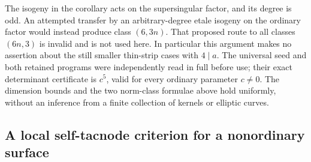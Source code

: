 \begin{remark}
\label{rem:DE-A3-mixed-axis-scope}
The isogeny in the corollary acts on the supersingular factor,
and its degree is odd.
An attempted transfer by an arbitrary-degree etale isogeny on
the ordinary factor would instead produce class $(6,3n)$.
That proposed route to all classes $(6n,3)$ is invalid and is
not used here.  In particular this argument makes no assertion
about the still smaller thin-strip cases with $4\mid a$.
The universal seed and both retained programs were independently
read in full before use; their exact determinant certificate is
$c^5$, valid for every ordinary parameter $c\ne0$.
The dimension bounds and the two norm-class formulae above
hold uniformly, without an inference from a finite collection
of kernels or elliptic curves.
\end{remark}


\subsection{A local self-tacnode criterion for a nonordinary surface}
\label{subsec:ss-self-tacnode}

